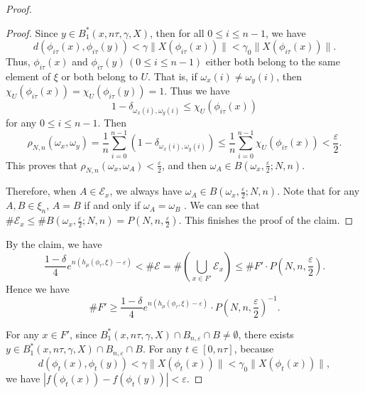 \documentclass[10pt,a4paper]{amsart}
\begin{document}
\begin{proof}
\begin{proof}
Since \( y \in B_1^*(x, n\tau, \gamma, X) \), then for all \( 0 \leq i \leq n - 1 \), we have
\[
d(\phi_{i\tau}(x), \phi_{i\tau}(y)) < \gamma \| X(\phi_{i\tau}(x)) \| < \gamma_0 \| X(\phi_{i\tau}(x)) \|.
\]
Thus, \( \phi_{i\tau}(x) \) and \( \phi_{i\tau}(y)\, (0\leq i\leq n-1)\) either both belong to the same element of \(\xi\) or both belong to \( U \). That is, if \( \omega_x(i) \neq \omega_y(i) \), then \( \chi_U(\phi_{i\tau}(x)) = \chi_U(\phi_{i\tau}(y)) = 1 \). Thus we have
\[
1 - \delta_{\omega_x(i), \omega_y(i)} \leq \chi_U(\phi_{i\tau}(x))
\]
for any $0\leq i\leq n-1$. Then
\[
\rho_{N,n}(\omega_x, \omega_y) = \frac{1}{n} \sum_{i = 0}^{n - 1} (1 - \delta_{\omega_x(i), \omega_y(i)}) \leq \frac{1}{n} \sum_{i = 0}^{n - 1} \chi_U(\phi_{i\tau}(x)) < \frac{\varepsilon}{2}.
\]
This proves that \( \rho_{N,n}(\omega_x, \omega_A) < \frac{\varepsilon}{2} \), and then \( \omega_A \in B\left( \omega_x, \frac{\varepsilon}{2}; N, n \right) \).

Therefore, when \(A\in \mathcal{E}_x \), we always have \( \omega_A \in B\left( \omega_x, \frac{\varepsilon}{2}; N, n \right) \). Note that for any $A, B\in \xi_n$, \( A=B \) if and only if \( \omega_A = \omega_B \) . We can see that \( \#\mathcal{E}_x \leq \# B\left( \omega_x, \frac{\varepsilon}{2}; N, n \right) = P\left( N, n, \frac{\varepsilon}{2} \right) \). This finishes the proof of the claim.
\end{proof}

By the claim, we have
\[
\frac{1 - \delta}{4} e^{n(h_\mu(\phi_\tau, \xi) - \varepsilon)} < \#\mathcal{E} = \#\left( \bigcup_{x \in F'} \mathcal{E}_x \right) \leq \# F' \cdot P\left( N, n, \frac{\varepsilon}{2} \right).
\]
Hence we have
\[
\# F' \geq \frac{1 - \delta}{4} e^{n(h_\mu(\phi_\tau, \xi) - \varepsilon)} \cdot P\left( N, n, \frac{\varepsilon}{2} \right)^{-1}.
\]

For any \( x \in F' \), since \( B_1^*(x, n\tau, \gamma, X) \cap B_{n, \varepsilon} \cap B \neq \emptyset \), there exists
\(
y \in B_1^*(x, n\tau, \gamma, X) \cap B_{n, \varepsilon} \cap B.
\)
For any $t\in[0, n\tau]$, because
\[
d(\phi_t(x), \phi_t(y)) < \gamma\| X(\phi_t(x)) \| < \gamma_0 \| X(\phi_t(x)) \|,
\]
we have \(
|f(\phi_t(x)) - f(\phi_t(y))| < \varepsilon.
\)


\end{proof}
\end{document}
